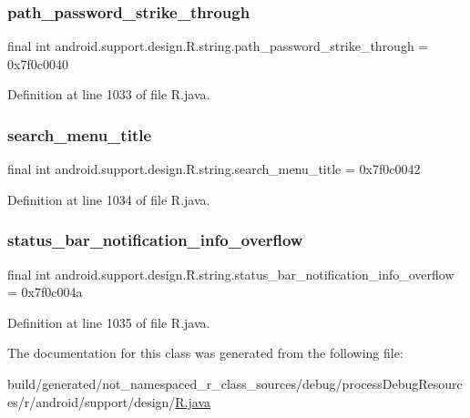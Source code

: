 \subsubsection{\texorpdfstring{path\_password\_strike\_through}{path\_password\_strike\_through}}
{\footnotesize\ttfamily final int android.\+support.\+design.\+R.\+string.\+path\+\_\+password\+\_\+strike\+\_\+through = 0x7f0c0040\hspace{0.3cm}{\ttfamily [static]}}



Definition at line 1033 of file R.\+java.

\mbox{\label{classandroid_1_1support_1_1design_1_1_r_1_1string_a5b51cc800abfd3edfc464432c67dade9}} 
\subsubsection{\texorpdfstring{search\_menu\_title}{search\_menu\_title}}
{\footnotesize\ttfamily final int android.\+support.\+design.\+R.\+string.\+search\+\_\+menu\+\_\+title = 0x7f0c0042\hspace{0.3cm}{\ttfamily [static]}}



Definition at line 1034 of file R.\+java.

\mbox{\label{classandroid_1_1support_1_1design_1_1_r_1_1string_ae7e600aba7d20d01b5e3b4ccc3847bc9}} 
\subsubsection{\texorpdfstring{status\_bar\_notification\_info\_overflow}{status\_bar\_notification\_info\_overflow}}
{\footnotesize\ttfamily final int android.\+support.\+design.\+R.\+string.\+status\+\_\+bar\+\_\+notification\+\_\+info\+\_\+overflow = 0x7f0c004a\hspace{0.3cm}{\ttfamily [static]}}



Definition at line 1035 of file R.\+java.



The documentation for this class was generated from the following file\+:\begin{DoxyCompactItemize}
\item 
build/generated/not\+\_\+namespaced\+\_\+r\+\_\+class\+\_\+sources/debug/process\+Debug\+Resources/r/android/support/design/\mbox{\hyperlink{android_2support_2design_2_r_8java}{R.\+java}}\end{DoxyCompactItemize}
